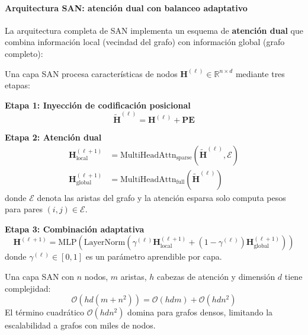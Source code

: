 \paragraph{Arquitectura SAN: atención dual con balanceo adaptativo}

La arquitectura completa de SAN implementa un esquema de \textbf{atención dual} que combina información local (vecindad del grafo) con información global (grafo completo):

\begin{definition}\label{def:san_layer}
Una capa SAN procesa características de nodos $\mathbf{H}^{(\ell)} \in \mathbb{R}^{n \times d}$ mediante tres etapas:

\textbf{Etapa 1: Inyección de codificación posicional}
\begin{equation}
    \tilde{\mathbf{H}}^{(\ell)} = \mathbf{H}^{(\ell)} + \mathbf{PE}
    \label{eq:san_pe_injection}
\end{equation}

\textbf{Etapa 2: Atención dual}
\begin{align}
    \mathbf{H}_{\text{local}}^{(\ell+1)} &= \text{MultiHeadAttn}_{\text{sparse}}\left(\tilde{\mathbf{H}}^{(\ell)}, \mathcal{E}\right) \label{eq:san_local_attn} \\
    \mathbf{H}_{\text{global}}^{(\ell+1)} &= \text{MultiHeadAttn}_{\text{full}}\left(\tilde{\mathbf{H}}^{(\ell)}\right) \label{eq:san_global_attn}
\end{align}
donde $\mathcal{E}$ denota las aristas del grafo y la atención esparsa solo computa pesos para pares $(i,j) \in \mathcal{E}$.

\textbf{Etapa 3: Combinación adaptativa}
\begin{equation}
    \mathbf{H}^{(\ell+1)} = \text{MLP}\left(\text{LayerNorm}\left(\gamma^{(\ell)} \mathbf{H}_{\text{local}}^{(\ell+1)} + (1-\gamma^{(\ell)}) \mathbf{H}_{\text{global}}^{(\ell+1)}\right)\right)
    \label{eq:san_adaptive_combination}
\end{equation}
donde $\gamma^{(\ell)} \in [0,1]$ es un parámetro aprendible por capa.
\end{definition}

\begin{proposition}\label{prop:san_complexity}
Una capa SAN con $n$ nodos, $m$ aristas, $h$ cabezas de atención y dimensión $d$ tiene complejidad:
\begin{equation}
    \mathcal{O}(hd(m + n^2)) = \mathcal{O}(hdm) + \mathcal{O}(hdn^2)
    \label{eq:san_complexity}
\end{equation}
El término cuadrático $\mathcal{O}(hdn^2)$ domina para grafos densos, limitando la escalabilidad a grafos con miles de nodos.
\end{proposition}


